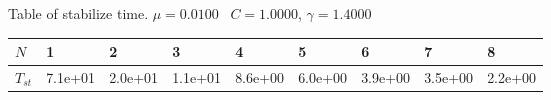 \begin{center}
Table of stabilize time. $\mu = 0.0100$ \, $C = 1.0000$, $\gamma = 1.4000$
  
\begin{tabular}{|p{0.6in}|p{0.6in}|p{0.6in}|p{0.6in}|p{0.6in}|p{0.6in}|p{0.6in}|p{0.6in}|p{0.6in}|} \hline
$N$ &1 &2 &3 &4 &5 &6 &7 &8 \\ \hline 
$T_{st}$ &7.1e+01 &2.0e+01 &1.1e+01 &8.6e+00 &6.0e+00 &3.9e+00 &3.5e+00 &2.2e+00 \\ \hline 

\end{tabular}\\[20pt]
\end{center}
